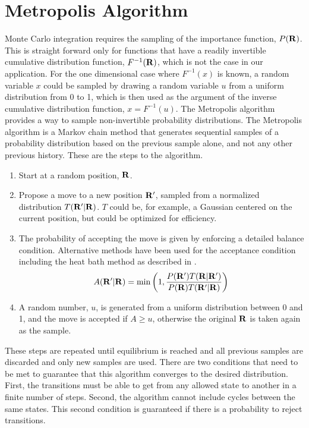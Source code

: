 \section{Metropolis Algorithm}
Monte Carlo integration requires the sampling of the importance function, $P(\mathbf{R})$. This is straight forward only for functions that have a readily invertible cumulative distribution function, $F^{-1}(\mathbf{R})$, which is not the case in our application. For the one dimensional case where $F^{-1}(x)$ is known, a random variable $x$ could be sampled by drawing a random variable $u$ from a uniform distribution from 0 to 1, which is then used as the argument of the inverse cumulative distribution function, $x=F^{-1}(u)$. The Metropolis algorithm provides a way to sample non-invertible probability distributions. The Metropolis algorithm is a Markov chain method that generates sequential samples of a probability distribution based on the previous sample alone, and not any other previous history. These are the steps to the algorithm.
\begin{enumerate}
   \item Start at a random position, $\mathbf{R}$.
   \item Propose a move to a new position $\mathbf{R}'$, sampled from a normalized distribution $T(\mathbf{R}'|\mathbf{R})$. $T$ could be, for example, a Gaussian centered on the current position, but could be optimized for efficiency.
   \item The probability of accepting the move is given by enforcing a detailed balance condition. Alternative methods have been used for the acceptance condition including the heat bath method as described in \cite{sethna2006}.
   \begin{equation}
      A(\mathbf{R}'|\mathbf{R}) = \mathrm{min}\left(1, \frac{P(\mathbf{R}')T(\mathbf{R}|\mathbf{R}')}{P(\mathbf{R})T(\mathbf{R}'|\mathbf{R})}\right)
   \end{equation}
   \item A random number, $u$, is generated from a uniform distribution between 0 and 1, and the move is accepted if $A\ge u$, otherwise the original $\mathbf{R}$ is taken again as the sample.
\end{enumerate}

These steps are repeated until equilibrium is reached and all previous samples are discarded and only new samples are used. There are two conditions that need to be met to guarantee that this algorithm converges to the desired distribution. First, the transitions must be able to get from any allowed state to another in a finite number of steps. Second, the algorithm cannot include cycles between the same states. This second condition is guaranteed if there is a probability to reject transitions.

